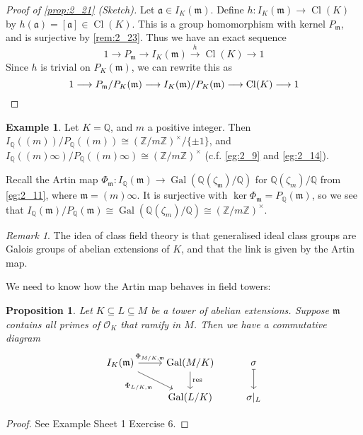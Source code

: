 \documentclass[11pt]{article}
\theoremstyle{definition}
\newtheorem{example}[definition]{Example}
\theoremstyle{plain}
\newtheorem{proposition}[definition]{Proposition}
\theoremstyle{remark}
\newtheorem{remark}[definition]{Remark}
\DeclareMathOperator{\Gal}{Gal}
\DeclareMathOperator{\Cl}{Cl}
\DeclareMathOperator{\res}{res}
\newcommand{\ZZ}{\mathbb{Z}}
\newcommand{\QQ}{\mathbb{Q}}
\newcommand{\cO}{\mathcal{O}}
\newcommand{\fa}{\mathfrak{a}}
\newcommand{\fm}{\mathfrak{m}}
\begin{document}
\begin{proof}[Proof of \autoref{prop:2_21} (Sketch)]
    Let $\fa \in I_K(\fm)$. Define $h : I_K(\fm) \to \Cl(K)$ by $h(\fa) = [\fa] \in \Cl(K)$. This is a group homomorphism with kernel $P_\fm$, and is surjective by \autoref{rem:2_23}. Thus we have an exact sequence
    \begin{equation*}
        1 \longrightarrow P_\fm \longrightarrow I_K(\fm) \overset{h}{\longrightarrow} \Cl(K) \longrightarrow 1
    \end{equation*}
    Since $h$ is trivial on $P_K(\fm)$, we can rewrite this as
    \begin{equation*}
        1 \longrightarrow P_\fm/P_K(\fm) \longrightarrow I_K(\fm)/P_K(\fm) \longrightarrow \Cl(K) \longrightarrow 1 \qedhere
    \end{equation*}
\end{proof}

\begin{example}\label{eg:2_24}
    Let $K = \QQ$, and $m$ a positive integer. Then $I_\QQ((m))/P_\QQ((m)) \cong (\ZZ/m\ZZ)^\times / \{\pm 1\}$, and $I_\QQ((m)\infty)/P_\QQ((m)\infty) \cong (\ZZ/m\ZZ)^\times$ (c.f. \autoref{eg:2_9} and \autoref{eg:2_14}).

    Recall the Artin map $\Phi_\fm : I_\QQ(\fm) \to \Gal(\QQ(\zeta_\fm) / \QQ)$ for $\QQ(\zeta_m)/\QQ$ from \autoref{eg:2_11}, where $\fm = (m) \infty$. It is surjective with $\ker \Phi_\fm = P_\QQ(\fm)$, so we see that $I_\QQ(\fm)/P_\QQ(\fm) \cong \Gal(\QQ(\zeta_m)/\QQ) \cong (\ZZ/m\ZZ)^\times$.
\end{example}

\begin{remark}\label{rem:2_25}
    The idea of class field theory is that generalised ideal class groups are Galois groups of abelian extensions of $K$, and that the link is given by the Artin map.
\end{remark}

\noindent We need to know how the Artin map behaves in field towers:

\begin{proposition}\label{prop:2_26}
    Let $K \subseteq L \subseteq M$ be a tower of abelian extensions. Suppose $\fm$ contains all primes of $\cO_K$ that ramify in $M$. Then we have a commutative diagram
    \begin{equation*}
    \begin{tikzcd}
        I_K(\fm) \arrow[r, "\Phi_{M/K,\fm}"] \arrow[rd, "\Phi_{L/K,\fm}"'] & \Gal(M/K) \arrow[d, "\res"] & \sigma \arrow[d, mapsto]\\
                                                                           & \Gal(L/K) & \sigma \vert_L
    \end{tikzcd}
    \end{equation*}
\end{proposition}
\begin{proof}
    See Example Sheet 1 Exercise 6.
\end{proof}
\end{document}
